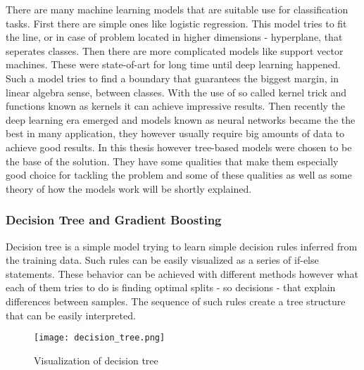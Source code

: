 \documentclass[a4paper,twoside,12pt]{book}
\begin{document}
There are many machine learning models that are suitable use for classification tasks. First there are simple ones like logistic regression. This model tries to fit the line, or in case of problem located in higher dimensions - hyperplane, that seperates classes. Then there are more complicated models like support vector machines. These were state-of-art for long time until deep learning happened. Such a model tries to find a boundary that guarantees the biggest margin, in linear algebra sense, between classes. With the use of so called kernel trick and functions known as kernels it can achieve impressive results. Then recently the deep learning era emerged and models known as neural networks became the the best in many application, they however usually require big amounts of data to achieve good results.
In this thesis however tree-based models were chosen to be the base of the solution. They have some qualities that make them especially good choice for tackling the problem and some of these qualities as well as some theory of how the models work will be shortly explained.

\subsubsection{Decision Tree and Gradient Boosting}

Decision tree is a simple model trying to learn simple decision rules inferred from the training data. Such rules can be easily visualized as a series of if-else statements. These behavior can be achieved with different methods however what each of them tries to do is finding optimal splits - so decisions - that explain differences between samples. The sequence of such rules create a tree structure that can be easily interpreted.


\begin{figure}[h]
    \centering
    \texttt{[image: decision\_tree.png]}
    \caption{Visualization of decision tree}
    \label{fig:mesh1}
\end{figure}
\end{document}
